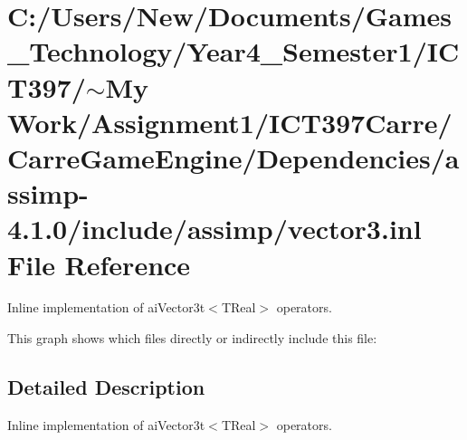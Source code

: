 \hypertarget{vector3_8inl}{
\section{C:/Users/New/Documents/Games\_\-Technology/Year4\_\-Semester1/ICT397/$\sim$My Work/Assignment1/ICT397Carre/CarreGameEngine/Dependencies/assimp-4.1.0/include/assimp/vector3.inl File Reference}
\label{vector3_8inl}
}
Inline implementation of aiVector3t$<$TReal$>$ operators. 



This graph shows which files directly or indirectly include this file:

\subsection{Detailed Description}
Inline implementation of aiVector3t$<$TReal$>$ operators. 

